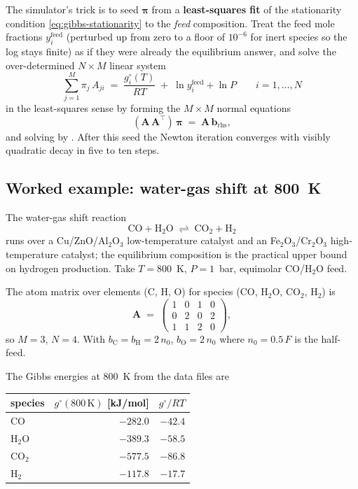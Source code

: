 \documentclass[11pt,a4paper]{article}
\begin{document}
The simulator's trick is to seed $\boldsymbol{\pi}$ from a
\textbf{least-squares fit} of the stationarity condition
\eqref{eq:gibbs-stationarity} to the \emph{feed} composition.  Treat
the feed mole fractions $y_i^{\mathrm{feed}}$ (perturbed up from
zero to a floor of $10^{-6}$ for inert species so the log stays
finite) as if they were already the equilibrium answer, and solve
the over-determined $N \times M$ linear system
\begin{equation}
   \sum_{j=1}^{M} \pi_j\,A_{ji}
   \;=\; \frac{g_i^{\circ}(T)}{RT} \;+\; \ln y_i^{\mathrm{feed}} + \ln P
   \qquad i = 1, \dots, N
\end{equation}
in the least-squares sense by forming the $M \times M$ normal
equations
\begin{equation}
   (\mathbf{A}\,\mathbf{A}^{\!\top})\,\boldsymbol{\pi}
   \;=\;
   \mathbf{A}\,\mathbf{b}_{\mathrm{rhs}},
\end{equation}
and solving by .  After this seed the
Newton iteration converges with visibly quadratic decay in five to
ten steps.

\subsection{Worked example: water-gas shift at 800~K}

The water-gas shift reaction
\[
   \mathrm{CO} + \mathrm{H_2O} \;\rightleftharpoons\; \mathrm{CO_2} + \mathrm{H_2}
\]
runs over a Cu/ZnO/Al$_2$O$_3$ low-temperature catalyst and an
Fe$_2$O$_3$/Cr$_2$O$_3$ high-temperature catalyst; the equilibrium
composition is the practical upper bound on hydrogen production.
Take $T = 800$~K, $P = 1$~bar, equimolar CO/H$_2$O feed.

The atom matrix over elements (C, H, O) for species (CO, H$_2$O,
CO$_2$, H$_2$) is
\[
   \mathbf{A} \;=\;
   \begin{pmatrix}
     1 & 0 & 1 & 0 \\
     0 & 2 & 0 & 2 \\
     1 & 1 & 2 & 0
   \end{pmatrix},
\]
so $M = 3$, $N = 4$.  With $b_{\mathrm{C}} = b_{\mathrm{H}} =
2\,n_0$, $b_{\mathrm{O}} = 2\,n_0$ where $n_0 = 0.5\,F$ is the half-feed.

The Gibbs energies at 800~K from the data files are
\begin{center}\small
\begin{tabular}{lrr}
\toprule
species   & $g^{\circ}(800\,\mathrm{K})$ [kJ/mol] & $g^{\circ}/RT$\\
\midrule
CO        & $-282.0$  & $-42.4$\\
H$_2$O    & $-389.3$  & $-58.5$\\
CO$_2$    & $-577.5$  & $-86.8$\\
H$_2$     & $-117.8$  & $-17.7$\\
\bottomrule
\end{tabular}
\end{center}
\end{document}
